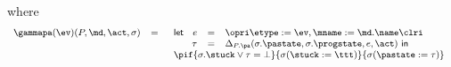 \noindent where
\[
{\small
\begin{array}[t]{rcl}
\gammapa(\ev)(P, \md, \act, \sigma) & = &
\begin{array}[t]{l}
\mathsf{let\ }
\begin{array}[t]{rcl}
  e & = & \opri \etype := \ev, \mname := \md.\name \clri\\
 \tau & = & \Delta_{P.\pa}(\sigma.\pastate, \sigma.\progstate, e, \act)
\mathsf{\ in\ }\end{array}
\\
\pif{\sigma.\stuck \vee \tau = \bot}
    {\sigma (\stuck := \ttt)}
    {\sigma (\pastate := \tau)}
\end{array}
\end{array}}
\]

